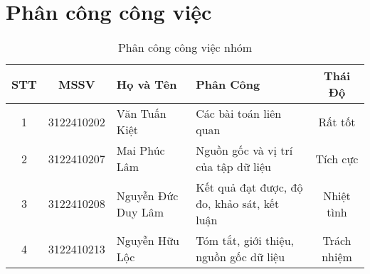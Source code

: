 \documentclass{article}
\begin{document}
\begin{titlepage}
\end{titlepage}

\newpage

\section*{Phân công công việc} %

\vspace{0.5cm} %

\begin{table}[h]
    \centering
    \renewcommand{\arraystretch}{1.3}
    \begin{tabularx}{\textwidth}{|c|c|X|X|c|}
        \hline
        \textbf{STT} & \textbf{MSSV} & \textbf{Họ và Tên} & \textbf{Phân Công} & \textbf{Thái Độ} \\ 
        \hline
        1 & 3122410202 & Văn Tuấn Kiệt & Các bài toán liên quan & Rất tốt \\ 
        \hline
        2 & 3122410207 & Mai Phúc Lâm & Nguồn gốc và vị trí của tập dữ liệu & Tích cực \\ 
        \hline
        3 & 3122410208 & Nguyễn Đức Duy Lâm & Kết quả đạt được, độ đo, khảo sát, kết luận & Nhiệt tình \\ 
        \hline
        4 & 3122410213 & Nguyễn Hữu Lộc & Tóm tắt, giới thiệu, nguồn gốc dữ liệu & Trách nhiệm \\ 
        \hline
    \end{tabularx}
    \caption{Phân công công việc nhóm}
    \label{tab:phancong}
\end{table}

\vspace{0.5cm}

\newpage
\tableofcontents
\newpage
\end{document}

